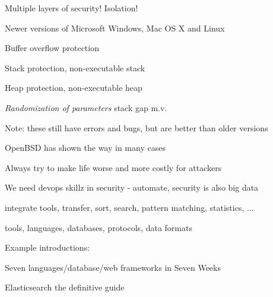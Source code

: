 \documentclass[20pt,landscape,a4paper,footrule]{foils}
\begin{document}


\centerline{\hlkbig\color{security6blue} Multiple layers of security! Isolation!}



\begin{list1}
\item Newer versions of Microsoft Windows, Mac OS X and Linux
\begin{list2}
\item Buffer overflow protection
\item Stack protection, non-executable stack
\item Heap protection, non-executable heap
\item \emph{Randomization of parameters} stack gap m.v.
\end{list2}
\item Note: these still have errors and bugs, but are better than older versions
\item OpenBSD has shown the way in many cases\\ 
\end{list1}

\vskip 1cm

\centerline{Always try to make life worse and more costly for attackers}







\begin{list1}
\item We need devops skillz in security - automate, security is also big data
\item integrate tools, transfer, sort, search, pattern matching, statistics, ...
\item tools, languages, databases, protocols, data formats
\item Example introductions:
\begin{list2}
\item Seven languages/database/web frameworks in Seven Weeks
\item Elasticsearch the definitive guide\\
\item {}
\item {}
\end{list2}
\end{list1}
\end{document}
